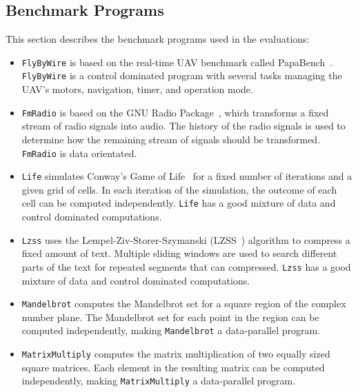 \subsection{Benchmark Programs}
This section describes the benchmark programs used in
the evaluations:
\begin{itemize}
	\item \texttt{FlyByWire} is based on the real-time UAV benchmark 
		  called PapaBench~\cite{benchmark_papabench}. \verb$FlyByWire$
		  is a control dominated program with several tasks 
		  managing the UAV's motors, navigation, timer, and 
		  operation mode.
		  
	\item \texttt{FmRadio} \cite{streaming_openmp_extension} is 
		  based on the GNU Radio Package~\cite{benchmark_gnu_radio}, which 
		  transforms a fixed stream of radio signals into 
		  audio. The history of the radio signals 
		  is used to determine how the remaining stream of 
		  signals should be transformed. \verb$FmRadio$ is data orientated.
		  
	\item \texttt{Life} simulates Conway's Game of Life~\cite{Gardner70} for a fixed
		  number of iterations and a given grid of cells. In each iteration
		  of the simulation, the outcome of each cell can be computed 
		  independently. \verb$Life$ has a good 
		  mixture of data and control dominated computations.
		  
	\item \texttt{Lzss} uses the Lempel-Ziv-Storer-Szymanski (LZSS~\cite{benchmark_lzss}) 
		  algorithm to compress a fixed amount of text. Multiple
		  sliding windows are used to search different parts of the 
		  text for repeated segments that can compressed. \verb$Lzss$ has
		  a good mixture of data and control dominated computations.
		  
	\item \texttt{Mandelbrot} computes the Mandelbrot
		  set for a square region of the complex number plane. The
		  Mandelbrot set for each point in the region can be computed 
		  independently, making \verb$Mandelbrot$ a data-parallel program.
		  
	\item \texttt{MatrixMultiply} computes the matrix
		  multiplication of two equally sized square matrices. Each
		  element in the resulting matrix can be computed independently,
		  making \verb$MatrixMultiply$ a data-parallel program.
\end{itemize}


